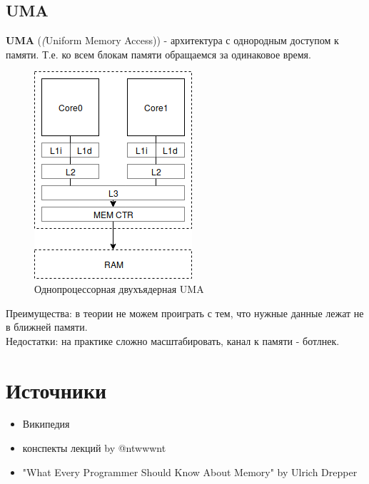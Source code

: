 \documentclass[12pt, a4paper]{article}
\begin{document}
\subsection{UMA}
\textbf{UMA} (\textit(Uniform Memory Access)) - архитектура с однородным доступом к памяти. Т.е. ко всем блокам памяти обращаемся за одинаковое время.
\begin{figure}[h!]
    \centering
    \includegraphics[scale=0.4]{./images/2CoreUMA.png}
    \caption{Однопроцессорная двухъядерная UMA}
    \label{fig:UMA}
\end{figure}
Преимущества: в теории не можем проиграть с тем, что нужные данные лежат не в ближней памяти.\\
Недостатки: на практике сложно масштабировать, канал к памяти - ботлнек.
\section{Источники}
\begin{itemize}
    \item Википедия
    \item конспекты лекций by @ntwwwnt
    \item "What Every Programmer Should Know About Memory" by Ulrich Drepper
\end{itemize}
\end{document}
